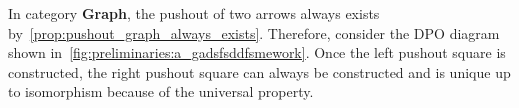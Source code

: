 
In category \textbf{Graph}, the pushout of two arrows always exists by~\autoref{prop:pushout_graph_always_exists}. Therefore, consider the DPO diagram shown in~\autoref{fig:preliminaries:a_gadsfsddfsmework}. Once the left pushout square is constructed, the right pushout square can always be constructed and is unique up to isomorphism because of the universal property.
\begin{figure}[H]
      \centering
        \caption{}
        \label{fig:preliminaries:a_gadsfsddfsmework}
\end{figure}

